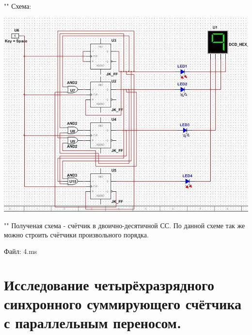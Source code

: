 \documentclass[a4paper,12pt]{article}
\begin{document}
""\newline\newline
\noindent Схема:
\begin{center}
	\includegraphics[scale=0.8]{../screens/4.jpg}
\end{center}

""\newline
\noindent Полученая схема - счётчик в двоично-десятичной СС. По данной схеме так же можно строить счётчики произвольного порядка.\newline

\noindent Файл: 4.ms\newline

\section{Исследование четырёхразрядного синхронного суммирующего счётчика с параллельным переносом.}
 
\end{document}
